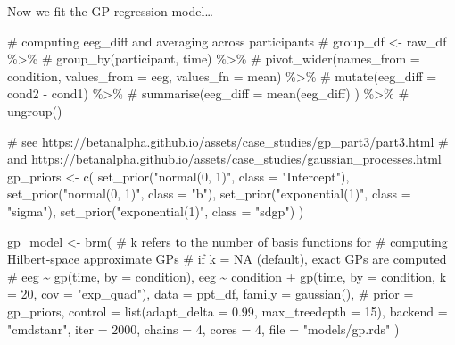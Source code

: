 \documentclass[
  doc,
  floatsintext,
  longtable,
  a4paper,
  nolmodern,
  notxfonts,
  notimes,
  colorlinks=true,linkcolor=blue,citecolor=blue,urlcolor=blue]{apa7}
\newenvironment{Shaded}{\begin{snugshade}}{\end{snugshade}}
\newcommand{\AttributeTok}[1]{\textcolor[rgb]{0.40,0.45,0.13}{#1}}
\newcommand{\CommentTok}[1]{\textcolor[rgb]{0.37,0.37,0.37}{#1}}
\newcommand{\DecValTok}[1]{\textcolor[rgb]{0.68,0.00,0.00}{#1}}
\newcommand{\FloatTok}[1]{\textcolor[rgb]{0.68,0.00,0.00}{#1}}
\newcommand{\FunctionTok}[1]{\textcolor[rgb]{0.28,0.35,0.67}{#1}}
\newcommand{\NormalTok}[1]{\textcolor[rgb]{0.00,0.23,0.31}{#1}}
\newcommand{\OtherTok}[1]{\textcolor[rgb]{0.00,0.23,0.31}{#1}}
\newcommand{\SpecialCharTok}[1]{\textcolor[rgb]{0.37,0.37,0.37}{#1}}
\newcommand{\StringTok}[1]{\textcolor[rgb]{0.13,0.47,0.30}{#1}}
\begin{document}
Now we fit the GP regression model\ldots{}

\begin{Shaded}
\begin{Highlighting}[]
\CommentTok{\# computing eeg\_diff and averaging across participants}
\CommentTok{\# group\_df \textless{}{-} raw\_df \%\textgreater{}\%}
\CommentTok{\#     group\_by(participant, time) \%\textgreater{}\%}
\CommentTok{\#     pivot\_wider(names\_from = condition, values\_from = eeg, values\_fn = mean) \%\textgreater{}\%}
\CommentTok{\#     mutate(eeg\_diff = cond2 {-} cond1) \%\textgreater{}\%}
\CommentTok{\#     summarise(eeg\_diff = mean(eeg\_diff) ) \%\textgreater{}\%}
\CommentTok{\#     ungroup()}

\CommentTok{\# see https://betanalpha.github.io/assets/case\_studies/gp\_part3/part3.html}
\CommentTok{\# and https://betanalpha.github.io/assets/case\_studies/gaussian\_processes.html}
\NormalTok{gp\_priors }\OtherTok{\textless{}{-}} \FunctionTok{c}\NormalTok{(}
    \FunctionTok{set\_prior}\NormalTok{(}\StringTok{"normal(0, 1)"}\NormalTok{, }\AttributeTok{class =} \StringTok{"Intercept"}\NormalTok{),}
    \FunctionTok{set\_prior}\NormalTok{(}\StringTok{"normal(0, 1)"}\NormalTok{, }\AttributeTok{class =} \StringTok{"b"}\NormalTok{),}
    \FunctionTok{set\_prior}\NormalTok{(}\StringTok{"exponential(1)"}\NormalTok{, }\AttributeTok{class =} \StringTok{"sigma"}\NormalTok{),}
    \FunctionTok{set\_prior}\NormalTok{(}\StringTok{"exponential(1)"}\NormalTok{, }\AttributeTok{class =} \StringTok{"sdgp"}\NormalTok{)}
\NormalTok{    )}

\NormalTok{gp\_model }\OtherTok{\textless{}{-}} \FunctionTok{brm}\NormalTok{(}
    \CommentTok{\# k refers to the number of basis functions for}
    \CommentTok{\# computing Hilbert{-}space approximate GPs}
    \CommentTok{\# if k = NA (default), exact GPs are computed}
    \CommentTok{\# eeg \textasciitilde{} gp(time, by = condition),}
\NormalTok{    eeg }\SpecialCharTok{\textasciitilde{}}\NormalTok{ condition }\SpecialCharTok{+} \FunctionTok{gp}\NormalTok{(time, }\AttributeTok{by =}\NormalTok{ condition, }\AttributeTok{k =} \DecValTok{20}\NormalTok{, }\AttributeTok{cov =} \StringTok{"exp\_quad"}\NormalTok{),}
    \AttributeTok{data =}\NormalTok{ ppt\_df,}
    \AttributeTok{family =} \FunctionTok{gaussian}\NormalTok{(),}
    \CommentTok{\# prior = gp\_priors,}
    \AttributeTok{control =} \FunctionTok{list}\NormalTok{(}\AttributeTok{adapt\_delta =} \FloatTok{0.99}\NormalTok{, }\AttributeTok{max\_treedepth =} \DecValTok{15}\NormalTok{),}
    \AttributeTok{backend =} \StringTok{"cmdstanr"}\NormalTok{,}
    \AttributeTok{iter =} \DecValTok{2000}\NormalTok{,}
    \AttributeTok{chains =} \DecValTok{4}\NormalTok{,}
    \AttributeTok{cores =} \DecValTok{4}\NormalTok{,}
    \AttributeTok{file =} \StringTok{"models/gp.rds"}
\NormalTok{    )}
\end{Highlighting}
\end{Shaded}
\end{document}
